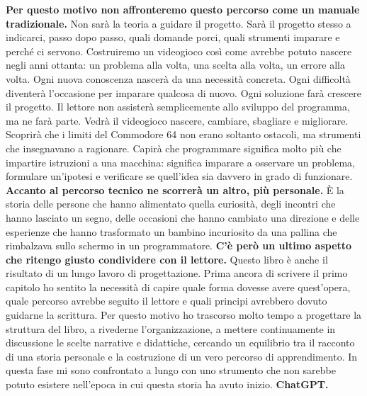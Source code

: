 \documentclass{article}
\begin{document}
\textbf{Per questo motivo non affronteremo questo percorso come un manuale tradizionale.}\newline
Non sarà la teoria a guidare il progetto. Sarà il progetto stesso a indicarci, passo dopo passo, quali domande porci,
quali strumenti imparare e perché ci servono. Costruiremo un videogioco così come avrebbe potuto nascere negli anni
ottanta: un problema alla volta, una scelta alla volta, un errore alla volta. Ogni nuova conoscenza nascerà da una
necessità concreta. Ogni difficoltà diventerà l'occasione per imparare qualcosa di nuovo. Ogni soluzione farà crescere
il progetto.\newline
Il lettore non assisterà semplicemente allo sviluppo del programma, ma ne farà parte. Vedrà il videogioco nascere,
cambiare, sbagliare e migliorare. Scoprirà che i limiti del Commodore 64 non erano soltanto ostacoli, ma strumenti che
insegnavano a ragionare. Capirà che programmare significa molto più che impartire istruzioni a una macchina: significa
imparare a osservare un problema, formulare un'ipotesi e verificare se quell'idea sia davvero in grado di
funzionare.\newline
\textbf{Accanto al percorso tecnico ne scorrerà un altro, più personale.}\newline
È la storia delle persone che hanno alimentato quella curiosità, degli incontri che hanno lasciato un segno, delle
occasioni che hanno cambiato una direzione e delle esperienze che hanno trasformato un bambino incuriosito da una
pallina che rimbalzava sullo schermo in un programmatore.\newline
\textbf{C'è però un ultimo aspetto che ritengo giusto condividere con il lettore.}\newline
Questo libro è anche il risultato di un lungo lavoro di progettazione. Prima ancora di scrivere il primo capitolo ho
sentito la necessità di capire quale forma dovesse avere quest'opera, quale percorso avrebbe seguito il lettore e quali
principi avrebbero dovuto guidarne la scrittura. Per questo motivo ho trascorso molto tempo a progettare la struttura
del libro, a rivederne l'organizzazione, a mettere continuamente in discussione le scelte narrative e didattiche,
cercando un equilibrio tra il racconto di una storia personale e la costruzione di un vero percorso di
apprendimento.\newline
In questa fase mi sono confrontato a lungo con uno strumento che non sarebbe potuto esistere nell'epoca in cui questa
storia ha avuto inizio.\newline
\textbf{ChatGPT.}\newline
\end{document}
